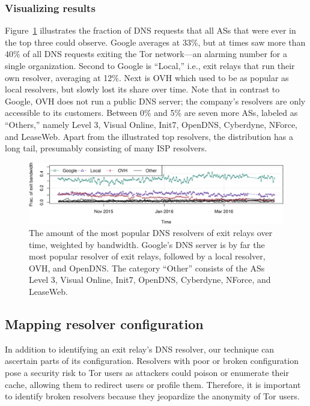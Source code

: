 \subsubsection{Visualizing results}
Figure~\ref{fig:exit-resolvers} illustrates the fraction of DNS requests that
all ASs that were ever in the top three could observe.  Google averages at
33\%, but at times saw more than 40\% of all DNS requests exiting the Tor
network---an alarming number for a single organization.  Second to Google is
``Local,'' i.e., exit relays that run their own resolver, averaging at 12\%.
Next is OVH which used to be as popular as local resolvers, but slowly lost its
share over time.  Note that in contrast to Google, OVH does not run a public
DNS server; the company's resolvers are only accessible to its customers.
Between 0\% and 5\% are seven more ASs, labeled as ``Others,'' namely Level 3,
Visual Online, Init7, OpenDNS, Cyberdyne, NForce, and LeaseWeb.  Apart from the
illustrated top resolvers, the distribution has a long tail, presumably
consisting of many ISP resolvers.

\begin{figure}[t]
	\centering
	\includegraphics[width=\linewidth]{figures/exit-resolvers.pdf}
	\caption{The amount of the most popular DNS resolvers of exit relays over
		time, weighted by bandwidth.  Google's DNS server is by far the most
		popular resolver of exit relays, followed by a local resolver, OVH, and
		OpenDNS.  The category ``Other'' consists of the ASs Level 3, Visual
		Online, Init7, OpenDNS, Cyberdyne, NForce, and LeaseWeb.}
	\label{fig:exit-resolvers}
\end{figure}

\iffalse
\subsection{Mapping resolver configuration}
\label{sec:mapping-configuration}
In addition to identifying an exit relay's DNS resolver, our technique can
ascertain parts of its configuration.  Resolvers with poor or broken
configuration pose a security risk to Tor users as attackers could poison or
enumerate their cache, allowing them to redirect users or profile them.
Therefore, it is important to identify broken resolvers because they jeopardize
the anonymity of Tor users.

